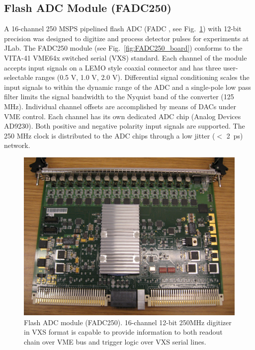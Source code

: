 \subsection{Flash ADC Module (FADC250)}

A 16-channel 250 MSPS pipelined flash ADC (FADC \cite{fadc-ref}, see Fig.~\ref{fig:FADC250pic}) with 12-bit precision was designed to digitize and process detector pulses for experiments at JLab.  The FADC250 module (see Fig.~\ref{fig:FADC250_board}) conforms to the VITA-41 VME64x switched serial (VXS) standard.  Each channel of the module accepts input signals on a LEMO style coaxial connector and has three user-selectable ranges (0.5 V, 1.0 V, 2.0 V).  Differential signal conditioning scales the input signals to within the dynamic range of the ADC and a single-pole low pass filter limits the signal bandwidth to the Nyquist band of the converter (125 MHz). Individual channel offsets are accomplished by means of DACs under VME control.  Each channel has its own dedicated ADC chip (Analog Devices AD9230). Both positive and negative polarity input signals are supported. The 250 MHz clock is distributed to the ADC chips through a low jitter ($<$ 2~ps) network.  

\begin{figure}[hbt]
	\centering
	\includegraphics[width=1.0\columnwidth,keepaspectratio]{img/FADC250pic.jpg}
	\caption{Flash ADC module (FADC250). 16-channel 12-bit 250MHz digitizer in VXS format is capable to provide information to both readout chain over VME bus and trigger logic over VXS serial lines.}
	\label{fig:FADC250pic}
\end{figure}


